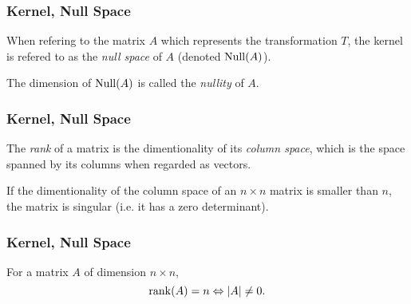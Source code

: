 \begin{frame}
  \frametitle{Kernel, Null Space}
  When refering to the matrix $A$ which represents the transformation $T$, the kernel is refered to as the \emph{null space} of $A$ (denoted $\operatorname{Null}(A)$).

  The dimension of $\operatorname{Null}(A)$ is called the \emph{nullity} of $A$.
\end{frame}

\begin{frame}
  \frametitle{Kernel, Null Space}
	The \emph{rank} of a matrix is the dimentionality of its \emph{column space}, which is the space spanned by its columns when regarded as vectors.

	If the dimentionality of the column space of an $n\times n$ matrix is smaller than $n$, the matrix is singular (i.e. it has a zero determinant).
\end{frame}

\begin{frame}
  \frametitle{Kernel, Null Space}
  For a matrix $A$ of dimension $n \times n$,
  \begin{equation*}
    \operatorname{rank}(A) = n \Leftrightarrow |A|\neq 0.
  \end{equation*}
\end{frame}
